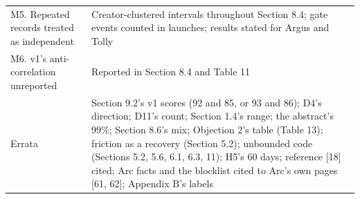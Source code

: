 {\begin{longtable}[]{@{}
  >{\raggedright\arraybackslash}p{}
  >{\raggedright\arraybackslash}p{}@{}}
M5. Repeated records treated as independent & Creator-clustered intervals throughout Section 8.4; gate events counted in launches; results stated for Argus and Tolly \\
M6. v1's anti-correlation unreported & Reported in Section 8.4 and Table 11 \\
Errata & Section 9.2's v1 scores (92 and 85, or 93 and 86); D4's direction; D11's count; Section 1.4's range; the abstract's 99\%; Section 8.6's mix; Objection 2's table (Table 13); friction as a recovery (Section 5.2); unbounded code (Sections 5.2, 5.6, 6.1, 6.3, 11); H5's 60 days; reference {[}18{]} cited; Arc facts and the blocklist cited to Arc's own pages {[}61, 62{]}; Appendix B's labels \\
\end{longtable}
}

